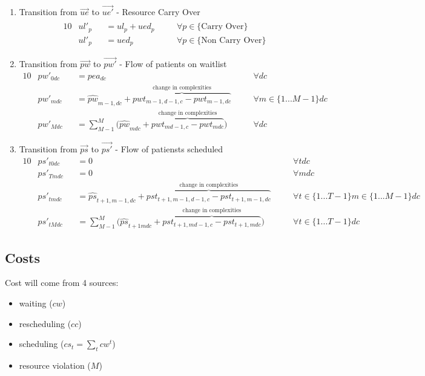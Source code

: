 \documentclass{article}
\begin{document}
\begin{enumerate}
	\item Transition from $\vec{ue}$ to $\vec{ue'}$ - Resource Carry Over
	\begin{alignat}{10}
		& ul'_{p} 
			&& = \hat{ul}_{p} + ued_{p} \quad 
			&& \forall p \in \{ \text{Carry Over}\} \\
		& ul'_{p} 
			&& = ued_{p} \quad 
			&& \forall p \in \{ \text{Non Carry Over}\} 
	\end{alignat} 

	
	\item Transition from $\vec{pw}$ to $\vec{pw'}$ - Flow of patients on waitlist
		\begin{alignat}{10}
			& pw'_{0dc} 
				&& = pea_{dc} \quad
				&& \forall dc \\  
			& pw'_{mdc} 
				&& = \hat{pw}_{m-1,dc} + 
				\overbrace{pwt_{m-1,d-1,c} - pwt_{m-1,dc}}^\text{
					change in complexities} \quad
				&& \forall m \in \{ 1...M-1 \} dc \\  
			& pw'_{Mdc} 
				&& = \sum_{M-1}^{M} \big( 
					\hat{pw}_{mdc} + 
					\overbrace{pwt_{md-1,c} - pwt_{mdc}}^\text{
						change in complexities} \big) \quad
				&& \forall dc
		\end{alignat}


	\item Transition from $\vec{ps}$ to $\vec{ps'}$ - Flow of patiensts scheduled
		\begin{alignat}{10}
			& ps'_{t0dc} 
				&& = 0 \quad
				&& \forall tdc \\  
			& ps'_{Tmdc} 
				&& = 0 \quad
				&& \forall mdc \\  
			& ps'_{tmdc} 
				&& = \hat{ps}_{t+1,m-1,dc} + 
				\overbrace{pst_{t+1,m-1,d-1,c} - pst_{t+1,m-1,dc}}^\text{
					change in complexities} \quad
				&& \forall t \in \{1...T-1\} m \in \{ 1...M-1 \} dc \\  
			& ps'_{tMdc} 
				&& = \sum_{M-1}^{M} \big( 
				\hat{ps}_{t+1mdc} + 
				\overbrace{pst_{t+1,md-1,c} - pst_{t+1,mdc}}^\text{
					change in complexities} \big) \quad
				&& \forall t \in \{1...T-1\} dc
		\end{alignat}
\end{enumerate}
    
\subsection{Costs}
Cost will come from 4 sources:  
\begin{itemize} 
	\item waiting ($cw$)
	\item rescheduling ($cc$) 
	\item scheduling ($cs_{t} = \sum_{t}cw^{t}$)
	\item resource violation ($M$)
\end{itemize}
\end{document}

